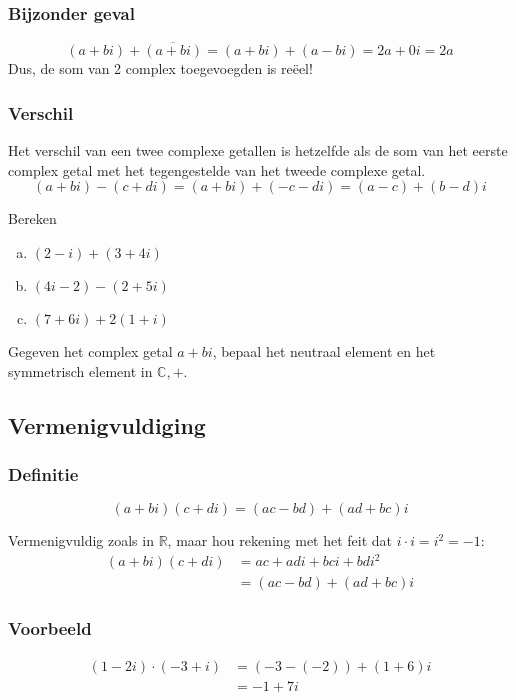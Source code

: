 \documentclass[12pt,twoside,a4paper]{article}
\begin{document}
\subsubsection*{Bijzonder geval}
\[(a+bi) + \overline{(a+bi)}=(a+bi) + (a-bi) = 2a+0i = 2a\]
Dus, de som van 2 complex toegevoegden is reëel!

\subsubsection*{Verschil}
Het verschil van een twee complexe getallen is hetzelfde als de som van het eerste complex getal met het tegengestelde van het tweede complexe getal.
\[(a+bi)-(c+di)=(a+bi)+(-c-di)=(a-c)+(b-d)i\]

\begin{oefening}
  Bereken
  \begin{enumerate}[(a)]
  \itemsep1em
  \item $\displaystyle (2-i)+(3+4i)$
  \item $\displaystyle (4i-2)-(2+5i)$
  \item $\displaystyle (7+6i)+2(1+i)$
  \end{enumerate}
\end{oefening}

\begin{oefening}
  Gegeven het complex getal $a+bi$, bepaal het neutraal element en het symmetrisch element in $\mathbb{C}, +$.
\end{oefening}

\subsection{Vermenigvuldiging}

\subsubsection*{Definitie}
\begin{mdframed}
\[(a+bi)(c+di) = (ac - bd) + (ad + bc)i\]
\end{mdframed}

Vermenigvuldig zoals in $\mathbb{R}$, maar hou rekening met het feit dat $i\cdot i=i^2=-1$:
\begin{align*}
  (a+bi)(c+di) &= ac + adi + bci + bdi^2\\
               &= (ac - bd) + (ad + bc)i
\end{align*}

\subsubsection*{Voorbeeld}
\begin{align*}
  (1-2i)\cdot(-3+i) &= (-3 - (-2)) + (1 + 6)i\\
               &= -1 + 7i
\end{align*}
\end{document}
